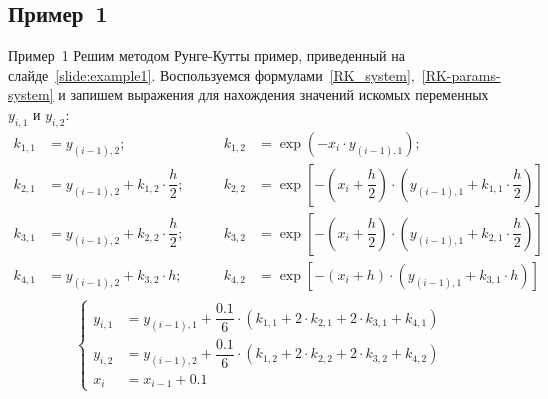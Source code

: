 \documentclass[aspectratio=169, mathserif]{beamer}	%
\begin{document}
\subsection{Пример~1}
\begin{frame}[fragile, label=c]{Пример~1}
\scriptsize
Решим  методом Рунге-Кутты пример, приведенный на слайде~\ref{slide:example1}.
Воспользуемся формулами~\eqref{RK_system},~\eqref{RK-params-system} и запишем выражения для нахождения значений искомых переменных $y_{i,1}$ и $y_{i,2}$:
\vfill
\begin{equation*}
	\begin{aligned}
		k_{1,1} &= y_{(i-1),2}; &\qquad
		k_{1,2} &= \exp\left(-x_i\cdot y_{(i-1),1}\right); \\
		k_{2,1} &= y_{(i-1),2} + k_{1,2}\cdot \dfrac{h}{2}; &\qquad
		k_{2,2} &= \exp\left[-\left(x_i + \dfrac{h}{2}\right) \cdot \left(y_{(i-1),1} + k_{1,1} \cdot \dfrac{h}{2}\right)\right] \\
		k_{3,1} &= y_{(i-1),2} + k_{2,2}\cdot \dfrac{h}{2}; &\qquad
		k_{3,2} &= \exp\left[-\left(x_i + \dfrac{h}{2}\right) \cdot \left(y_{(i-1),1} + k_{2,1} \cdot \dfrac{h}{2}\right)\right] \\
		k_{4,1} &= y_{(i-1),2} + k_{3,2} \cdot h; &\qquad
		k_{4,2} &= \exp\left[-\left(x_i + h\right) \cdot \left(y_{(i-1),1} + k_{3,1} \cdot h\right)\right] \\
	\end{aligned}
\end{equation*}
\vfill
\begin{equation*}
	\left\{
	\begin{aligned}
		y_{i,1} &= y_{(i-1),1} + \dfrac{0.1}{6} \cdot \left(k_{1,1} + 2\cdot k_{2,1} + 2 \cdot k_{3,1} + k_{4,1}\right) \\
		y_{i,2} &= y_{(i-1),2} + \dfrac{0.1}{6} \cdot \left(k_{1,2} + 2\cdot k_{2,2} + 2 \cdot k_{3,2} + k_{4,2}\right) \\
		x_{i} &= x_{i-1} + 0.1
	\end{aligned}
	\right.
\end{equation*}
\vfill
\end{frame}
\end{document}
